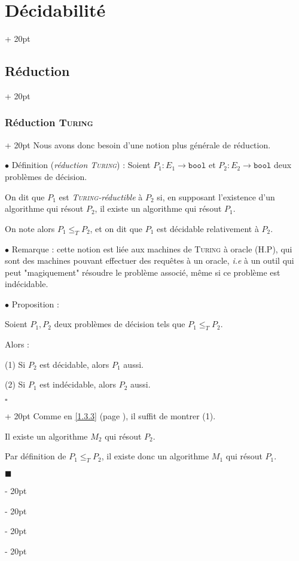 \documentclass[a4paper, 12pt, twoside]{article}
\renewcommand{\le}{\leqslant}
\newcommand{\ind}[1][20pt]{\advance\leftskip + #1}
\newcommand{\deind}[1][20pt]{\advance\leftskip - #1}
\newenvironment{indt}[2][20pt]{#2 \par \ind[#1]}{\par \deind} %
\newenvironment{proof}[1][{}]{\begin{indt}{$\square$ #1}}{$\blacksquare$ \end{indt}}
\begin{document}
\begin{indt}{\section{Décidabilité}}
\begin{indt}{\subsection{Réduction}}
\begin{indt}{\subsubsection{Réduction \textsc{Turing}}}
                Nous avons donc besoin d'une notion plus générale de réduction.

                \vspace{12pt}
                
                $\bullet$ Définition (\emph{réduction \textsc{Turing}}) :
                Soient $P_1 : E_1 \longrightarrow \mathtt{bool}$ et $P_2 : E_2 \longrightarrow \mathtt{bool}$ deux problèmes de décision.

                On dit que $P_1$ est \emph{\textsc{Turing}-réductible} à $P_2$ si, en supposant l'existence d'un algorithme qui résout $P_2$, il existe un algorithme qui résout $P_1$.

                On note alors $P_1 \le_T P_2$, et on dit que $P_1$ est décidable relativement à $P_2$.

                \vspace{12pt}
                
                $\bullet$ Remarque : cette notion est liée aux machines de \textsc{Turing} à oracle (H.P), qui sont des machines pouvant effectuer des requêtes à un oracle, \textit{i.e} à un outil qui peut "magiquement" résoudre le problème associé, même si ce problème est indécidable.

                \vspace{12pt}
                
                $\bullet$ Proposition :
                \begin{emphBox}
                    Soient $P_1, P_2$ deux problèmes de décision tels que $P_1 \le_T P_2$.

                    Alors :

                    (1) Si $P_2$ est décidable, alors $P_1$ aussi.

                    (2) Si $P_1$ est indécidable, alors $P_2$ aussi.
                \end{emphBox}

                \vspace{12pt}
                
                \begin{proof}
                    Comme en \ref{1.3.3} (page \pageref{1.3.3}), il suffit de montrer (1).

                    Il existe un algorithme $M_2$ qui résout $P_2$.

                    Par définition de $P_1 \le_T P_2$, il existe donc un algorithme $M_1$ qui résout $P_1$.


\end{proof}
\end{indt}
\end{indt}
\end{indt}
\end{document}
